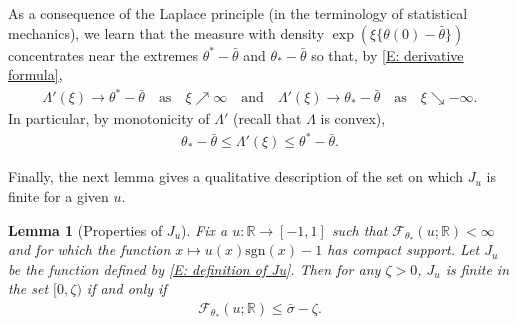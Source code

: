 \documentclass[12pt]{amsart}
\newtheorem{lemma}{Lemma}
\begin{document}
As a consequence of the Laplace principle (in the terminology of statistical mechanics), we learn that the measure with density $ \exp ( \xi \{ \theta(0) - \bar{\theta} \} ) $ concentrates near the extremes $ \theta^* - \bar{\theta} $ and $ \theta_{*} - \bar{\theta} $ so that, by \eqref{E: derivative formula},
	\begin{align} \label{E: asymptotics derivative lambda}
		\Lambda ' ( \xi ) \rightarrow \theta^* - \bar{\theta} \quad \text{as} \quad \xi \nearrow \infty
		\quad \text{and} \quad
		\Lambda ' ( \xi ) \rightarrow \theta_{*} - \bar{\theta} \quad \text{as} \quad \xi \searrow -\infty .
	\end{align}
In particular, by monotonicity of $\Lambda'$ (recall that $ \Lambda $ is convex),
	\begin{align*}
		\theta_{*} - \bar{\theta} \leq \Lambda'(\xi) \leq \theta^{*} - \bar{\theta}.
	\end{align*}

Finally, the next lemma gives a qualitative description of the set on which $J_{u}$ is finite for a given $u$.
	
\begin{lemma}[Properties of $ J_{ u } $] \label{L: finiteness trick} Fix a $u : \mathbb{R} \to [-1,1]$ such that $\mathscr{F}_{\theta_{*}}(u;\mathbb{R}) < \infty$ and for which the function $x \mapsto u(x) \text{sgn}(x) - 1$ has compact support.  Let $ J_{ u } $ be the function defined by \eqref{E: definition of Ju}.  Then for any $\zeta > 0$, $J_{u}$ is finite in the set $[0,\zeta)$ if and only if
		\begin{align*}
			\mathscr{F}_{\theta_{*}}(u;\mathbb{R}) \leq \bar{\sigma} - \zeta.
		\end{align*}
	\end{lemma}
\end{document}
